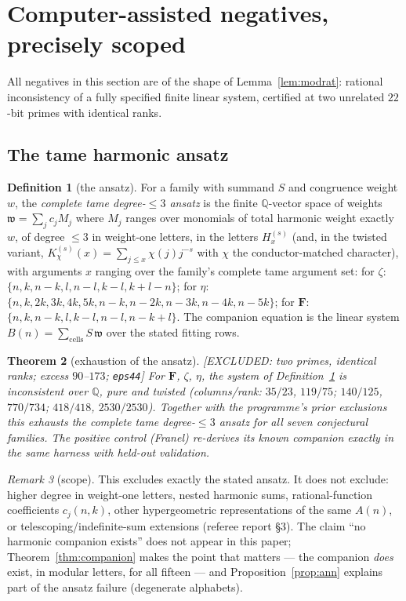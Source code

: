 \documentclass[11pt,reqno]{amsart}
\theoremstyle{plain}
\newtheorem{theorem}{Theorem}[section]
\theoremstyle{definition}
\newtheorem{definition}[theorem]{Definition}
\theoremstyle{remark}
\newtheorem{remark}[theorem]{Remark}
\newcommand{\Q}{\mathbb{Q}}
\newcommand{\HH}[2]{H^{(#1)}_{#2}}
\newcommand{\ExcludedR}[1]{\textup{\textsf{[EXCLUDED: #1]}}}
\begin{document}
\section{Computer-assisted negatives, precisely scoped}\label{sec:negatives}

All negatives in this section are of the shape of Lemma~\ref{lem:modrat}:
rational inconsistency of a fully specified finite linear system,
certified at two unrelated $22$-bit primes with identical ranks.

\subsection{The tame harmonic ansatz}\label{sec:exhaust}
\begin{definition}[the ansatz]\label{def:ansatz}
For a family with summand $S$ and congruence weight $w$, the \emph{complete
tame degree-$\le3$ ansatz} is the finite $\Q$-vector space of weights
$\mathfrak w=\sum_jc_jM_j$ where $M_j$ ranges over monomials of total
harmonic weight exactly $w$, of degree $\le3$ in weight-one letters, in
the letters $\HH sx$ (and, in the twisted variant, $K^{(s)}_\chi(x)=
\sum_{j\le x}\chi(j)j^{-s}$ with $\chi$ the conductor-matched character),
with arguments $x$ ranging over the family's complete tame argument set:
for $\zeta$: $\{n,k,n{-}k,l,n{-}l,k{-}l,k{+}l{-}n\}$;
for $\eta$: $\{n,k,2k,3k,4k,5k,n{-}k,n{-}2k,n{-}3k,n{-}4k,n{-}5k\}$;
for $\mathbf F$: $\{n,k,n{-}k,l,k{-}l,n{-}l,n{-}k{+}l\}$.
The companion equation is the linear system
$B(n)=\sum_{\text{cells}}S\,\mathfrak w$ over the stated fitting rows.
\end{definition}

\begin{theorem}[exhaustion of the ansatz]\label{thm:exhaust}
\ExcludedR{two primes, identical ranks; excess $90$--$173$;
\texttt{eps44}}\quad
For $\mathbf F$, $\zeta$, $\eta$, the system of
Definition~\ref{def:ansatz} is inconsistent over $\Q$, pure and twisted
(columns/rank: $35/23$, $119/75$; $140/125$, $770/734$; $418/418$,
$2530/2530$). Together with the programme's prior exclusions this
exhausts the complete tame degree-$\le3$ ansatz for all seven conjectural
families. The positive control (Franel) re-derives its known companion
exactly in the same harness with held-out validation.
\end{theorem}

\begin{remark}[scope]
This excludes exactly the stated ansatz. It does not exclude: higher
degree in weight-one letters, nested harmonic sums, rational-function
coefficients $c_j(n,k)$, other hypergeometric representations of the same
$A(n)$, or telescoping/indefinite-sum extensions (referee report \S3).
The claim ``no harmonic companion exists'' does not appear in this paper;
Theorem~\ref{thm:companion} makes the point that matters --- the companion
\emph{does} exist, in modular letters, for all fifteen --- and
Proposition~\ref{prop:ann} explains part of the ansatz failure
(degenerate alphabets).
\end{remark}
\end{document}
